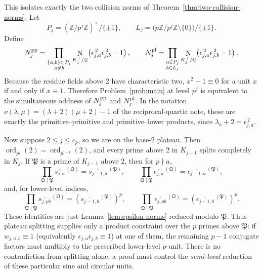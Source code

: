 \documentclass[a4paper]{article}
\newcommand{\Z}{\mathbb{Z}}
\newcommand{\Q}{\mathbb{Q}}
\newcommand{\ord}[2][]{\operatorname{ord}_{#1}\!\left(#2\right)}
\DeclareMathOperator{\Nm}{N}
\begin{document}
This isolates exactly the two collision norms of
Theorem~\ref{thm:two-collision-norms}.  Let
\[
	P_j=(\Z/p^j\Z)^\times/\{\pm1\},
	\qquad
	L_j=\bigl(p\Z/p^j\Z\setminus\{0\}\bigr)/\{\pm1\}.
\]
Define
\[
	N_j^{\rm pp}=
	\prod_{\substack{\{a,b\}\subset P_j\\a\ne b}}
	\Nm_{K_j^+/\Q}\!\left(\epsilon_{j,a}^{\,2}\epsilon_{j,b}^{\,2}-1\right),
	\qquad
	N_j^{\rm pl}=
	\prod_{\substack{a\in P_j\\ b\in L_j}}
	\Nm_{K_j^+/\Q}\!\left(\epsilon_{j,a}^{\,2}\epsilon_{j,b}^{\,2}-1\right).
\]
Because the residue fields above $2$ have characteristic two,
$x^2-1\equiv0$ for a unit $x$ if and only if $x\equiv1$.  Therefore
Problem~\ref{prob:main} at level $p^j$ is equivalent to the simultaneous
oddness of $N_j^{\rm pp}$ and $N_j^{\rm pl}$.  In the notation
$\nu(\lambda,\mu)=(\lambda+2)(\mu+2)-1$ of the reciprocal-quartic note,
these are exactly the primitive--primitive and primitive--lower products,
since $\lambda_a+2=\epsilon_{j,a}^{\,2}$.

Now suppose $2\leq j\leq c_p$, so we are on the base-$2$ plateau.  Then
$\ord[p^j]{2}=\ord[p^{j-1}]{2}$, and every prime above $2$ in
$K_{j-1}$ splits completely in $K_j$.  If $\mathfrak{P}$ is a prime of
$K_{j-1}$ above $2$, then for $p\nmid a$,
\[
	\prod_{\mathfrak{Q}\mid\mathfrak{P}}
		\overline{s_{j,a}}^{\,(\mathfrak Q)}
	=
	\overline{s_{j-1,\bar a}}^{\,(\mathfrak P)},
	\qquad
	\prod_{\mathfrak{Q}\mid\mathfrak{P}}
		\overline{\epsilon_{j,a}}^{\,(\mathfrak Q)}
	=
	\overline{\epsilon_{j-1,\bar a}}^{\,(\mathfrak P)},
\]
and, for lower-level indices,
\[
	\prod_{\mathfrak{Q}\mid\mathfrak{P}}
		\overline{s_{j,pb}}^{\,(\mathfrak Q)}
	=
	\left(\overline{s_{j-1,b}}^{\,(\mathfrak P)}\right)^p,
	\qquad
	\prod_{\mathfrak{Q}\mid\mathfrak{P}}
		\overline{\epsilon_{j,pb}}^{\,(\mathfrak Q)}
	=
	\left(\overline{\epsilon_{j-1,b}}^{\,(\mathfrak P)}\right)^p .
\]
These identities are just Lemma~\ref{lem:epsilon-norms} reduced modulo
$\mathfrak{P}$.  Thus plateau splitting supplies only a product constraint
over the $p$ primes above $\mathfrak{P}$: if
$w_{j,a,b}\equiv1$ (equivalently
$\epsilon_{j,a}\epsilon_{j,b}\equiv1$) at one of them, the remaining
$p-1$ conjugate factors must multiply to the prescribed lower-level
$p$-unit.  There is no contradiction from splitting alone; a proof must
control the \emph{semi-local} reduction of these particular sine and
circular units.
\end{document}

